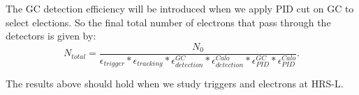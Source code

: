 \documentclass[a4paper,10.5pt]{article}
\begin{document}
 The GC detection efficiency will be introduced when we apply PID cut on GC to select elections. So the final total number of electrons that pass through the detectors is given by:
\begin{equation}
 N_{total} = \frac{N_{0}}{\epsilon_{trigger}\ast\epsilon_{tracking}\ast\epsilon_{detection}^{GC}\ast\epsilon_{detection}^{Calo}\ast\epsilon_{PID}^{GC}\ast\epsilon_{PID}^{Calo}}.
\end{equation}

The results above should hold when we study triggers and electrons at HRS-L.
\end{document}
